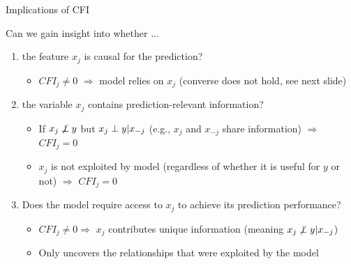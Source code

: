 \documentclass[11pt,compress,t,notes=noshow, aspectratio=169, xcolor=table]{beamer}
\begin{document}
\begin{frame}{Implications of CFI}

Can we gain insight into whether ...

\begin{enumerate}
    \item<1-3> the feature $x_j$ is causal for the prediction?
    \begin{itemize}
      \item $CFI_j \neq 0$ $\Rightarrow$ model relies on $x_j$ (converse does not hold, see next slide)
    \end{itemize}
    \item<2-3> the variable $x_j$ contains prediction-relevant information?
    \begin{itemize}
      \item If $x_j \not \indep y$ but $x_j \indep y | x_{-j}$ (e.g., $x_j$ and $x_{-j}$ share information) $\Rightarrow$ $CFI_j = 0$
      \item  $x_{j}$ is not exploited by model (regardless of whether it is useful for $y$ or not) $\Rightarrow$ $CFI_j = 0$
    \end{itemize}
    \item<3> Does the model require access to $x_j$ to achieve its prediction performance?
\begin{itemize}
      \item $CFI_j \neq 0 \Rightarrow$ $x_j$ contributes unique information (meaning $x_j \not \indep y | x_{-j}$)
      \item Only uncovers the relationships that were exploited by the model
    \end{itemize}
\end{enumerate}
\end{frame}
\end{document}
